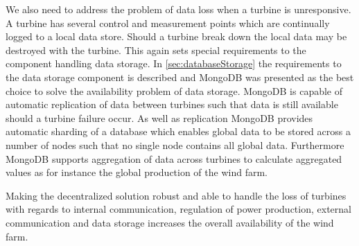 We also need to address the problem of data loss when a turbine is unresponsive. A turbine has several control and measurement points which are continually logged to a local data store. Should a turbine break down the local data may be destroyed with the turbine. This again sets special requirements to the component handling data storage. In \cref{sec:databaseStorage} the requirements to the data storage component is described and MongoDB was presented as the best choice to solve the availability problem of data storage. MongoDB is capable of automatic replication of data between turbines such that data is still available should a turbine failure occur. As well as replication MongoDB provides automatic sharding of a database which enables global data to be stored across a number of nodes such that no single node contains all global data. Furthermore MongoDB supports aggregation of data across turbines to calculate aggregated values as for instance the global production of the wind farm.

Making the decentralized solution robust and able to handle the loss of turbines with regards to internal communication, regulation of power production, external communication and data storage increases the overall availability of the wind farm. 
